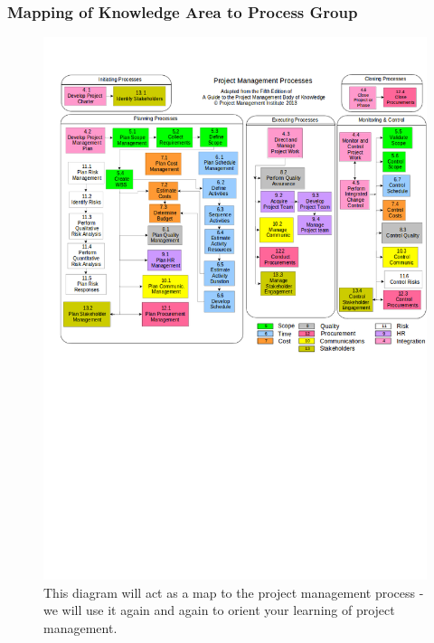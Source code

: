 \documentclass[aspectratio=169]{beamer}
\begin{document}
\begin{frame}
\frametitle{Mapping of Knowledge Area to Process Group}
\vspace{-0.5cm}
\begin{figure}
\caption{This diagram will act as a map to the project management process - we will use it again and again to orient your learning of project management.}
\vspace{-0.8cm}
\includegraphics[scale=0.3]{mapping}
\end{figure}
\end{frame}
\end{document}
